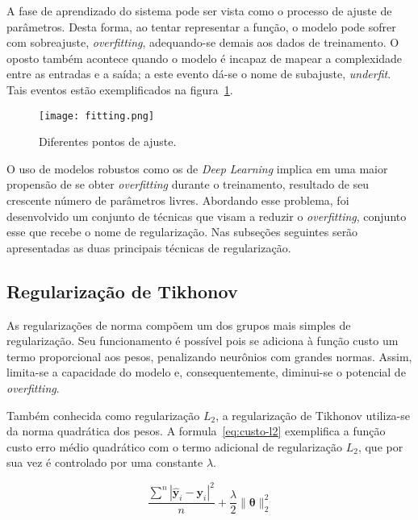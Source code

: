 A fase de aprendizado do sistema pode ser vista como o processo de ajuste de parâmetros. Desta forma, ao tentar representar a função, o modelo pode sofrer com sobreajuste, \textit{overfitting}, adequando-se demais aos dados de treinamento. O oposto também acontece quando o modelo é incapaz de mapear a complexidade entre as entradas e a saída; a este evento dá-se o nome de subajuste, \textit{underfit}. Tais eventos estão exemplificados na figura~\ref{fig:fitting}.


\begin{figure}
\begin{center} {
    \begin{center}
    \texttt{[image: fitting.png]}
    \caption{Diferentes pontos de ajuste.}
    \label{fig:fitting}
    \end{center}
}
\end{center}
\end{figure}

O uso de modelos robustos como os de \textit{Deep Learning} implica em uma maior propensão de se obter \textit{overfitting} durante o treinamento, resultado de seu crescente número de parâmetros livres. Abordando esse problema, foi desenvolvido um conjunto de técnicas que visam a reduzir o \textit{overfitting}, conjunto esse que recebe o nome de regularização. Nas subseções seguintes serão apresentadas as duas principais técnicas de regularização.

\subsection{Regularização de Tikhonov}

As regularizações de norma compõem um dos grupos mais simples de regularização. Seu funcionamento é possível pois se adiciona à função custo um termo proporcional aos pesos, penalizando neurônios com grandes normas. Assim, limita-se a capacidade do modelo e, consequentemente, diminui-se o potencial de \textit{overfitting}.

Também conhecida como regularização $L_{2}$, a regularização de Tikhonov utiliza-se da norma quadrática dos pesos. A formula~\ref{eq:custo-l2} exemplifica a função custo erro médio quadrático com o termo adicional de regularização $L_{2}$, que por sua vez é controlado por uma constante $\lambda$.

\begin{equation} \label{eq:custo-l2}
    \frac{\displaystyle\sum^n |\hat{\mathbf{y}}_i - \mathbf{y}_i|^2}{n} + \frac{\lambda}{2} \lVert \boldsymbol{\theta} \rVert_{2}^{2}
\end{equation}

